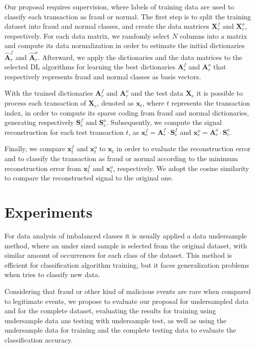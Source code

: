 Our proposal requires supervision, where labels of training data are used to classify each transaction as fraud or normal. The first step is to split the training dataset into fraud and normal classes, and create the data matrices $\boldsymbol{X}_r^f$ and $\boldsymbol{X}_r^o$, respectively. For each data matrix, we randomly select $N$ columns into a matrix and compute its data normalization in order to estimate the initial dictionaries $\boldsymbol{\hat{A}}_r^f$ and $\boldsymbol{\hat{A}}_r^o$. Afterward, we apply the dictionaries and the data matrices to the selected DL algorithms for learning the best dictionaries $\boldsymbol{A}_r^f$ and $\boldsymbol{A}_r^o$ that respectively represents fraud and normal classes as basis vectors.

With the trained dictionaries $\boldsymbol{A}_r^f$ and $\boldsymbol{A}_r^o$ and the test data $\boldsymbol{X}_e$ it is possible to process each transaction of $\boldsymbol{X}_e$, denoted as $\boldsymbol{x}_t$, where $t$ represents the transaction index, in order to compute its sparse coding from fraud and normal dictionaries, generating respectively $\boldsymbol{S}_e^f$ and $\boldsymbol{S}_e^o$. Subsequently, we compute the signal reconstruction for each test transaction $t$, as $\boldsymbol{x}_e^f = \boldsymbol{A}_r^f \cdot \boldsymbol{S}_e^f$ and $\boldsymbol{x}_e^o = \boldsymbol{A}_r^o \cdot \boldsymbol{S}_e^o$. 

Finally, we compare $\boldsymbol{x}_t^f$ and $\boldsymbol{x}_t^o$ to $\boldsymbol{x}_t$ in order to evaluate the reconstruction error and to classify the transaction as fraud or normal according to the minimum reconstruction error from $\boldsymbol{x}_t^f$ and $\boldsymbol{x}_t^o$, respectively. We adopt the cosine similarity to compare the reconstructed signal to the original one. 


\section{Experiments}
\label{sec:4_experiments}

For data analysis of imbalanced classes it is usually applied a data undersample method, where an under sized sample is selected from the original dataset, with similar amount of occurrences for each class of the dataset. This method is efficient for classification algorithm training, but it faces generalization problems when tries to classify new data. 

Considering that fraud or other kind of malicious events are rare when compared to legitimate events, we propose to evaluate our proposal for undersampled data and for the complete dataset, evaluating the results for training using undersample data ans testing with undersample test, as well as using the undersample data for training and the complete testing data to evaluate the classification accuracy.

